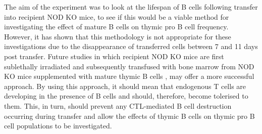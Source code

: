 The aim of the experiment was to look at the lifespan of B cells following transfer into recipient NOD KO mice, to see if this would be a viable method for investigating the effect of mature B cells on thymic pro B cell frequency.
However, it has shown that this methodology is not appropriate for these investigations due to the disappearance of transferred cells between 7 and 11 days post transfer.
Future studies in which recipient NOD KO mice are first sublethally irradiated and subsequently transfused with bone marrow from NOD KO mice supplemented with mature thymic B cells \citep{Serreze1998}, may offer a more successful approach.
By using this approach, it should mean that endogenous T cells are developing in the presence of B cells and should, therefore, become tolerised to them.
This, in turn, should prevent any CTL-mediated B cell destruction occurring during transfer and allow the effects of thymic B cells on thymic pro B cell populations to be investigated.


